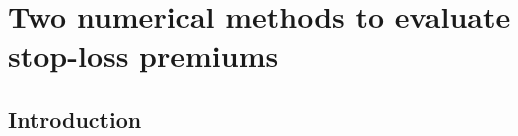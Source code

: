% 


\chapter{Two numerical methods to evaluate stop-loss premiums}
\section{Introduction}\label{sec:Introduction}


